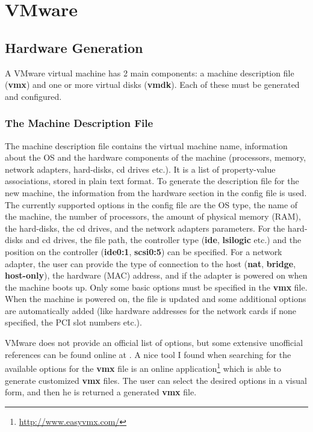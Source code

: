 \chapter{VMware}
\label{chapter:vmware}

\section{Hardware Generation}
\label{sec:vmware-hw}

A VMware virtual machine has 2 main components: a machine description file
(\textbf{vmx}) and one or more virtual disks (\textbf{vmdk}). Each of these
must be generated and configured.

\subsection{The Machine Description File}
\label{sub-sec:vmx}
The machine description file contains the virtual machine name, information
about the OS and the hardware components of the machine (processors, memory,
network adapters, hard-disks, cd drives etc.). It is a list of property-value
associations, stored in plain text format. To generate the description file
for the new machine, the information from the hardware section in the config
file is used. The currently supported options in the config file are the OS
type, the name of the machine, the number of processors, the amount of physical
memory (RAM), the hard-disks, the cd drives, and the network adapters
parameters. For the hard-disks and cd drives, the file path, the controller
type (\textbf{ide}, \textbf{lsilogic} etc.) and the position on the controller
(\textbf{ide0:1}, \textbf{scsi0:5}) can be specified. For a network adapter,
the user can provide the type of connection to the host (\textbf{nat},
\textbf{bridge}, \textbf{host-only}), the hardware (MAC) address, and if the
adapter is powered on when the machine boots up. Only some basic options must
be specified in the \textbf{vmx} file. When the machine is powered on, the file
is updated and some additional options are automatically added (like hardware
addresses for the network cards if none specified, the PCI slot numbers etc.).

VMware does not provide an official list of options, but some extensive
unofficial references can be found online at \cite{vmx-sanbarrow}. A nice tool
I found when searching for the available options for the \textbf{vmx} file is
an online application\footnote{\url{http://www.easyvmx.com/}} which is able to
generate customized \textbf{vmx} files. The user can select the desired options
in a visual form, and then he is returned a generated \textbf{vmx} file.

